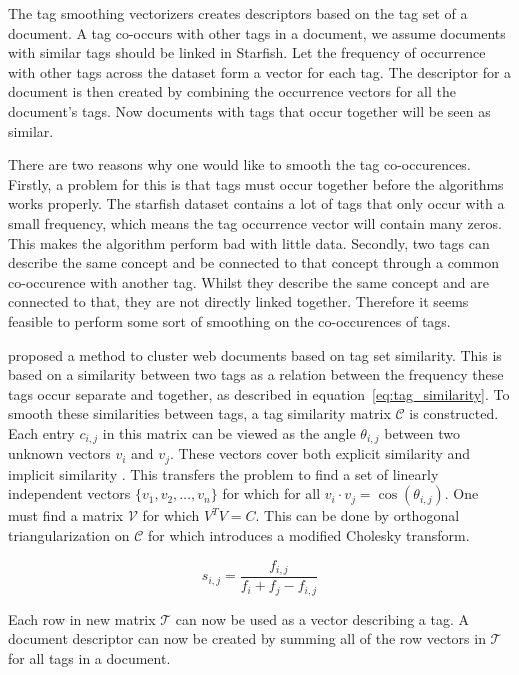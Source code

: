 The tag smoothing vectorizers creates descriptors based on the tag set of a document. A tag co-occurs with other tags in a document, we assume documents with similar tags should be linked in Starfish. Let the frequency of occurrence with other tags across the dataset form a vector for each tag. The descriptor for a document is then created by combining the occurrence vectors for all the document's tags. Now documents with tags that occur together will be seen as similar.

There are two reasons why one would like to smooth the tag co-occurences. Firstly, a problem for this is that tags must occur together before the algorithms works properly. The starfish dataset contains a lot of tags that only occur with a small frequency, which means the tag occurrence vector will contain many zeros. This makes the algorithm perform bad with little data. Secondly, two tags can describe the same concept and be connected to that concept through a common co-occurence with another tag. Whilst they describe the same concept and are connected to that, they are not directly linked together. Therefore it seems feasible to perform some sort of smoothing on the co-occurences of tags.

\citet{zhou2011web} proposed a method to cluster web documents based on tag set similarity. This is based on a similarity between two tags as a relation between the frequency these tags occur separate and together, as described in equation~\ref{eq:tag_similarity}. To smooth these similarities between tags, a tag similarity matrix $\mathcal{C}$ is constructed. Each entry $c_{i,j}$ in this matrix can be viewed as the angle $\theta_{i,j}$ between two unknown vectors $v_i$ and $v_j$. These vectors cover both explicit similarity and implicit similarity \citep{park2010vector}. This transfers the problem to find a set of linearly independent vectors $\{v_1,v_2,\ldots,v_n\}$ for which for all $v_i \cdot v_j = \cos(\theta_{i,j})$. One must find a matrix $\mathcal{V}$ for which $V^TV = C$. This can be done by orthogonal triangularization on $\mathcal{C}$ for which \citeauthor{zhou2011web} introduces a modified Cholesky transform.

\begin{equation} \label{eq:tag_similarity}
s_{i,j} = \frac{f_{i,j}}{f_i + f_j - f_{i,j}}
\end{equation}

Each row in new matrix $\mathcal{T}$ can now be used as a vector describing a tag. A document descriptor can now be created by summing all of the row vectors in  $\mathcal{T}$ for all tags in a document.
